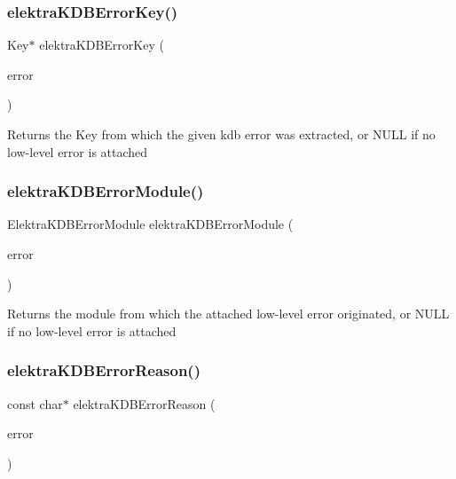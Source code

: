 \subsubsection{\texorpdfstring{elektra\+K\+D\+B\+Error\+Key()}{elektraKDBErrorKey()}}
{\footnotesize\ttfamily Key$\ast$ elektra\+K\+D\+B\+Error\+Key (\begin{DoxyParamCaption}\item[{const Elektra\+Error $\ast$}]{error }\end{DoxyParamCaption})}

\begin{DoxyReturn}{Returns}
the Key from which the given kdb error was extracted, or N\+U\+LL if no low-\/level error is attached 
\end{DoxyReturn}
\mbox{\label{group__highlevel_ga5b97344662184766bb6ac3a028a479b6}} 
\subsubsection{\texorpdfstring{elektra\+K\+D\+B\+Error\+Module()}{elektraKDBErrorModule()}}
{\footnotesize\ttfamily Elektra\+K\+D\+B\+Error\+Module elektra\+K\+D\+B\+Error\+Module (\begin{DoxyParamCaption}\item[{const Elektra\+Error $\ast$}]{error }\end{DoxyParamCaption})}

\begin{DoxyReturn}{Returns}
the module from which the attached low-\/level error originated, or N\+U\+LL if no low-\/level error is attached 
\end{DoxyReturn}
\mbox{\label{group__highlevel_ga9d988d59b288338f86c57b28ea8b8541}} 
\subsubsection{\texorpdfstring{elektra\+K\+D\+B\+Error\+Reason()}{elektraKDBErrorReason()}}
{\footnotesize\ttfamily const char$\ast$ elektra\+K\+D\+B\+Error\+Reason (\begin{DoxyParamCaption}\item[{const Elektra\+Error $\ast$}]{error }\end{DoxyParamCaption})}

